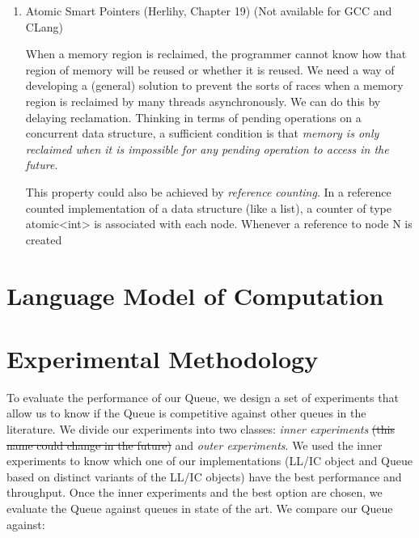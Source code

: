 \begin{enumerate}
\begin{lstlisting}[language=c++,label= ,caption= ,captionpos=b,numbers=none]
void func() {
    std::atomic<void*>& hp = get_hazard_pointer_for_current_thread();
    void* old_data = data.load();
    do {
        void* temp;
        do{ // Loop until you've set the hazard pointer
            temp = old_data;
            hp.store(old_data);
            old_data = data.load();
        } while (old_data != temp);
          }while (old_data &&
            !data.compare_exchange_strong(old_data, old_data->next);
    // Do something with old_data
    hp.store(nullptr); // clearing usage of hazard pointer
    // Trying clearing
    if (outstanding_hazard_pointers_for(old_head))
    {
        reclaim_later(old_data);
    }
    else
    {
        delete old_data;
    }
    delete_nodes_with_no_hazards();
}
\end{lstlisting}


\item Atomic Smart Pointers (Herlihy, Chapter 19) (Not available for GCC and CLang)
\label{sec:org58c7cdb}


When a memory region is reclaimed, the programmer cannot know how that
region of memory will be reused or whether it is reused. We need a
way of developing a (general) solution to prevent the sorts of races
when a memory region is reclaimed by many threads asynchronously. We can
do this by delaying reclamation.
Thinking in terms of pending operations on a concurrent data structure, a
sufficient condition is that \emph{memory is only reclaimed when it is impossible
for any pending operation to access in the future}.

This property could also be achieved by \emph{reference counting}. In a reference
counted implementation of a data structure (like a list), a counter of type
atomic<int> is associated with each node. Whenever a reference to node N is
created
\end{enumerate}

\section{\label{sec:practical-model}Language Model of Computation}
\section{\label{sec:methodology}Experimental Methodology}

\label{sec:orgebd0619}

To evaluate the performance of our Queue, we design a set of experiments that
allow us to know if the Queue is competitive against other queues in the
literature. We divide our experiments into two classes: \emph{inner experiments}
\sout{(this name could change in the future)} and \emph{outer experiments}. We used the
inner experiments to know which one of our implementations (LL/IC object and
Queue based on distinct variants of the LL/IC objects) have the best
performance and throughput. Once the inner experiments and the best
option are chosen, we evaluate the Queue against queues in state of the
art. We compare our Queue against:

